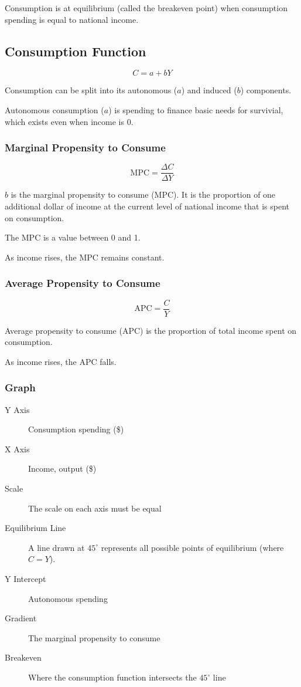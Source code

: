\documentclass[a4paper,11pt]{article}
\begin{document}
Consumption is at equilibrium (called the breakeven point) when consumption
spending is equal to national income.


\subsection{Consumption Function}

$$
C = a + bY
$$

Consumption can be split into its autonomous ($a$) and induced ($b$) components.

Autonomous consumption ($a$) is spending to finance basic needs for survivial,
which exists even when income is 0.


\subsubsection{Marginal Propensity to Consume}

$$
\mbox{MPC} = \frac{\Delta C}{\Delta Y}
$$

$b$ is the marginal propensity to consume (MPC). It is the proportion of one
additional dollar of income at the current level of national income that is
spent on consumption.

The MPC is a value between 0 and 1.

As income rises, the MPC remains constant.


\subsubsection{Average Propensity to Consume}

$$
\mbox{APC} = \frac{C}{Y}
$$

Average propensity to consume (APC) is the proportion of total income spent on
consumption.

As income rises, the APC falls.


\subsubsection{Graph}

\begin{description}
\item [Y Axis] Consumption spending (\$)
\item [X Axis] Income, output (\$)
\item [Scale] The scale on each axis must be equal
\item [Equilibrium Line] A line drawn at $45^\circ$ represents all possible
	points of equilibrium (where $C = Y$).
\item [Y Intercept] Autonomous spending
\item [Gradient] The marginal propensity to consume
\item [Breakeven] Where the consumption function intersects the $45^\circ$ line
\end{description}
\end{document}
